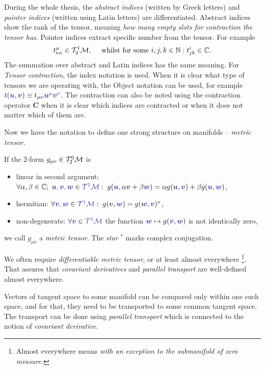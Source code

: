 During the whole thesis, the \emph{abstract indices} (written by Greek letters) and \emph{pointer indices} (written using Latin letters) are differentiated. Abstract indices show the rank of the tensor, meaning \emph{how many empty slots for contraction the tensor has}. Pointer indices extract specific number from the tensor. For example
$$t^\mu_{\nu\kappa} \in \mathcal{T}^1_2\mathcal{M}, \quad \text{ whilst for some }i,j,k\in\mathbb{N}: t^i_{jk}\in \mathbb C.$$
The summation over abstract and Latin indices has the same meaning. For \emph{Tensor contraction}, the index notation is used. When it is clear what type of tensors we are operating with, the Object notation can be used, for example $t(\bluee{\bm u},\bluee{\bm v})\equiv t_{\mu\nu}\bluee{\bm u^\mu \bm v^\nu}$. The contraction can also be noted using the contraction operator $\mathbf C$ when it is clear which indices are contracted or when it does not matter which of them are.

Now we have the notation to define one strong structure on manifolds -- \emph{metric tensor}. 
\begin{definition}
If the 2-form $g_{\mu\nu}\in\mathcal{T}^0_2\mathcal{M}$ is
\begin{itemize}
    \item linear in second argument: $\forall \alpha,\beta\in\C;\; \bluee{\bm u,\bm v,\bm w}\in \bluee{\TT^1\M}: \; g(\bluee{\bm u},\alpha\bluee{\bm v}+\beta \bluee{\bm w}) = \alpha g(\bluee{\bm u},\bluee{\bm v})+\beta g(\bluee{\bm u},\bluee{\bm w})$,
    \item hermitian: $\forall \bluee{\bm v,\bm w}\in \bluee{\TT^1\M}: \; g(\bluee{\bm v},\bluee{\bm w})=g(\bluee{\bm w},\bluee{\bm v})^*$,
    \item non-degenerate: $\forall \bluee{\bm v}\in\bluee{\TT^1\M}$ the function $\bluee{\bm w}\mapsto g(\bluee{\bm v},\bluee{\bm w})$ is not identically zero,
\end{itemize} 
we call $g_{\mu\nu}$ a \emph{metric tensor}. The \emph{star} $^*$ marks complex conjugation.
\end{definition}

We often require \emph{differentiable metric tensor}, or at least almost everywhere \footnote{Almost everywhere means \emph{with an exception to the submanifold of zero measure}.}. That assures that \emph{covariant derivatives} and \emph{parallel transport} are well-defined almost everywhere. 




Vectors of tangent space to some manifold can be compared only within one such space, and for that, they need to be transported to some common tangent space. The transport can be done using \emph{parallel transport} which is connected to the notion of \emph{covariant derivative}.

